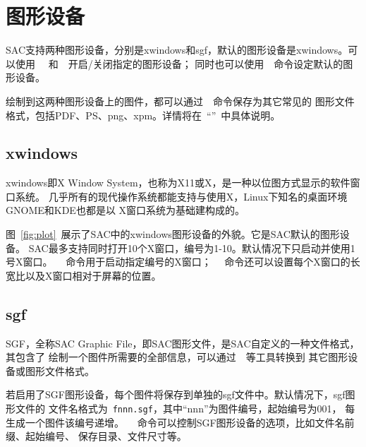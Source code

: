 \section{图形设备}
SAC支持两种图形设备，分别是xwindows和sgf，默认的图形设备是xwindows。可以使用
~~和~~开启/关闭指定的图形设备；
同时也可以使用~~命令设定默认的图形设备。

绘制到这两种图形设备上的图件，都可以通过~~命令保存为其它常见的
图形文件格式，包括PDF、PS、png、xpm。详情将在~``''~中具体说明。

\subsection{xwindows}
xwindows即X Window System，也称为X11或X，是一种以位图方式显示的软件窗口系统。
几乎所有的现代操作系统都能支持与使用X，Linux下知名的桌面环境GNOME和KDE也都是以
X窗口系统为基础建构成的。

图~\ref{fig:plot}~展示了SAC中的xwindows图形设备的外貌。它是SAC默认的图形设备。
SAC最多支持同时打开10个X窗口，编号为1-10。默认情况下只启动并使用1号X窗口。
~~命令用于启动指定编号的X窗口；
~~命令还可以设置每个X窗口的长宽比以及X窗口相对于屏幕的位置。

\subsection{sgf}
SGF，全称SAC Graphic File，即SAC图形文件，是SAC自定义的一种文件格式，其包含了
绘制一个图件所需要的全部信息，可以通过~~等工具转换到
其它图形设备或图形文件格式。

若启用了SGF图形设备，每个图件将保存到单独的sgf文件中。默认情况下，sgf图形文件的
文件名格式为~\lstinline{fnnn.sgf}，其中``nnn''为图件编号，起始编号为001，
每生成一个图件该编号递增。
~~命令可以控制SGF图形设备的选项，比如文件名前缀、起始编号、
保存目录、文件尺寸等。
